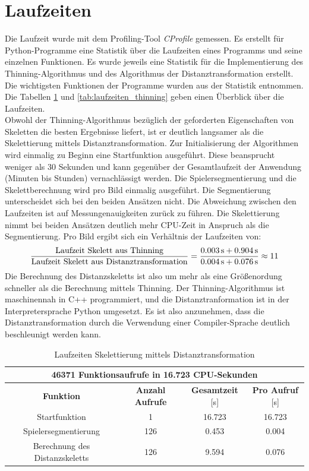 \section{Laufzeiten}
Die Laufzeit wurde mit dem Profiling-Tool \emph{CProfile} gemessen. Es erstellt für Python-Programme eine Statistik über die Laufzeiten eines Programms und seine einzelnen Funktionen. Es wurde jeweils eine Statistik
für die Implementierung des Thinning-Algorithmus und des Algorithmus der Distanztransformation erstellt. Die
wichtigsten Funktionen der Programme wurden aus der Statistik entnommen. Die Tabellen \ref{tab:laufzeiten_distanztransformation} und \ref{tab:laufzeiten_thinning} geben einen
Überblick über die Laufzeiten. \\
Obwohl der Thinning-Algorithmus bezüglich der geforderten Eigenschaften von Skeletten die besten Ergebnisse
liefert, ist er deutlich langsamer als die Skelettierung mittels
Distanztransformation. Zur Initialisierung der Algorithmen wird einmalig zu Beginn eine Startfunktion ausgeführt. Diese beansprucht weniger als 30 Sekunden und kann gegenüber der Gesamtlaufzeit der Anwendung (Minuten bis Stunden) vernachlässigt werden. Die Spielersegmentierung und die Skelettberechnung wird pro Bild einmalig ausgeführt. Die Segmentierung unterscheidet sich bei den beiden Ansätzen nicht. Die Abweichung zwischen den Laufzeiten ist auf Messungenauigkeiten zurück zu führen.  Die Skelettierung nimmt bei beiden Ansätzen deutlich mehr CPU-Zeit in Anspruch als die Segmentierung. Pro Bild ergibt sich ein Verhältnis der Laufzeiten von:
\begin{equation}
\frac{\textnormal{Laufzeit Skelett aus Thinning}}{\textnormal{Laufzeit Skelett aus Distanztransformation}}=\frac{0.003\,\textnormal{s}+0.904\,\textnormal{s}}{0.004\,\textnormal{s}+0.076\,\textnormal{s}}\approx 11
\end{equation}
Die Berechnung des Distanzskeletts ist also um mehr als eine Größenordung schneller als die Berechnung mittels Thinning. Der Thinning-Algorithmus ist maschinennah in C++ programmiert, und die Distanztranformation ist in der Interpretersprache Python umgesetzt. Es ist also anzunehmen, dass die Distanztransformation durch die  Verwendung einer Compiler-Sprache deutlich beschleunigt werden kann.
\begin{table}[htbp]
\begin{center}
\begin{tabular}{|c|c|c|c|}
 \hline
  \multicolumn{4}{|c|}{46371 Funktionsaufrufe in 16.723 CPU-Sekunden} \\
  \hline
\hline 
\textbf{Funktion} & \textbf{Anzahl Aufrufe} & \textbf{Gesamtzeit} [s] & \textbf{Pro Aufruf} [s]\\ 
\hline Startfunktion & 1 & 16.723 & 16.723 \\ 
\hline Spielersegmentierung & 126 & 0.453 & 0.004  \\ 
\hline Berechnung des Distanzskeletts & 126 & 9.594 & 0.076    \\ 
\hline 
\end{tabular} 
\end{center}
\caption{Laufzeiten Skelettierung mittels Distanztransformation}
\label{tab:laufzeiten_distanztransformation}
\end{table}
